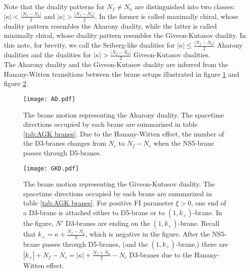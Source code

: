 \documentclass[a4paper,11pt]{article}
\begin{document}
Note that the duality patterns for $N_f \neq N_a$ are distinguished into two classes: $|\kappa| < \frac{|N_f-N_a|}{2}$ and $|\kappa| > \frac{|N_f-N_a|}{2}$. In \cite{Benini:2011mf} the former is called maximally chiral, whose duality pattern resembles the Aharony duality, while the latter is called minimally chiral, whose duality pattern resembles the Giveon-Kutasov duality. In this note, for brevity, we call the Seiberg-like dualities for $|\kappa| \leq \frac{|N_f-N_a|}{2}$ Aharony dualities and the dualities for $|\kappa| > \frac{|N_f-N_a|}{2}$ Giveon-Kutasov dualities.
\\


The Aharony duality and the Giveon-Kutasov duality are inferred from the Hanany-Witten transitions \cite{Hanany:1996ie} between the brane setups illustrated in figure \ref{fig:AD} and figure \ref{fig:GKD}.
%
\begin{figure}[tbp]
\centering %
\texttt{[image: AD.pdf]}
\caption{\label{fig:AD} The brane motion representing the Aharony duality. The spacetime directions occupied by each brane are summarized in table \ref{tab:AGK branes}. Due to the Hanany-Witten effect, the number of the D3-branes changes from $N_c$ to $N_f-N_c$ when the NS5-brane passes through D5-branes.}
\end{figure}
%
%
\begin{figure}[tbp]
\centering %
\texttt{[image: GKD.pdf]}
\caption{\label{fig:GKD} The brane motion representing the Giveon-Kutasov duality. The spacetime directions occupied by each brane are summarized in table \ref{tab:AGK branes}. For positive FI parameter $\xi > 0$, one end of a D3-brane is attached either to D5-brane or to $(1,k_+)$-brane. In the figure, $N'$ D3-branes are ending on the $(1,k_+)$-brane. Recall that $k_+ = \kappa+\frac{N_f-N_a}{2}$, which is negative in the figure. After the NS5-brane passes through D5-branes, (and the $(1,k_+)$-brane,) there are $|k_+|+N_f-N_c = |\kappa|+\frac{N_f+N_a}{2}-N_c$ D3-branes due to the Hanany-Witten effect.}
\end{figure}
%
%
\end{document}
